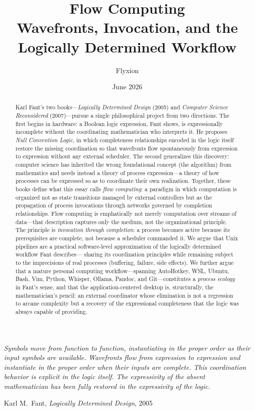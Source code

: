 \documentclass[12pt, a4paper]{article}
\title{\textbf{Flow Computing}\\[0.4em]
  \large Wavefronts, Invocation, and the Logically Determined Workflow}
\author{Flyxion}
\date{June 2026}
\begin{document}

\maketitle
\thispagestyle{empty}

\epigraph{%
  \itshape
  Symbols move from function to function, instantiating in the proper
  order as their input symbols are available. Wavefronts flow from
  expression to expression and instantiate in the proper order when their
  inputs are complete. This coordination behavior is explicit in the
  logic itself. The expressivity of the absent mathematician has been
  fully restored in the expressivity of the logic.%
}{Karl M.\ Fant, \textit{Logically Determined Design}, 2005}

\vspace{1.2em}

\begin{abstract}
\noindent
Karl Fant's two books---\textit{Logically Determined Design} (2005)
and \textit{Computer Science Reconsidered} (2007)---pursue a single
philosophical project from two directions. The first begins in hardware:
a Boolean logic expression, Fant shows, is expressionally incomplete
without the coordinating mathematician who interprets it. He proposes
\emph{Null Convention Logic}, in which completeness relationships
encoded in the logic itself restore the missing coordination so that
wavefronts flow spontaneously from expression to expression without any
external scheduler. The second generalizes this discovery: computer
science has inherited the wrong foundational concept (the algorithm)
from mathematics and needs instead a theory of process expression---a
theory of how processes can be expressed so as to coordinate their own
realization. Together, these books define what this essay calls
\emph{flow computing}: a paradigm in which computation is organized
not as state transitions managed by external controllers but as the
propagation of process invocations through networks governed by
completion relationships. Flow computing is emphatically not merely
computation over streams of data---that description captures only the
medium, not the organizational principle. The principle is
\emph{invocation through completion}: a process becomes active because
its prerequisites are complete, not because a scheduler commanded it.
We argue that Unix pipelines are a practical software-level
approximation of the logically determined workflow Fant describes---
sharing its coordination principles while remaining subject to the
imprecisions of real processes (buffering, failure, side effects). We
further argue that a mature personal computing workflow---spanning
AutoHotkey, WSL, Ubuntu, Bash, Vim, Python, Whisper, Ollama, Pandoc,
and Git---constitutes a \emph{process ecology} in Fant's sense, and
that the application-centered desktop is, structurally, the
mathematician's pencil: an external coordinator whose elimination is
not a regression to arcane complexity but a recovery of the
expressional completeness that the logic was always capable of
providing.
\end{abstract}
\end{document}
